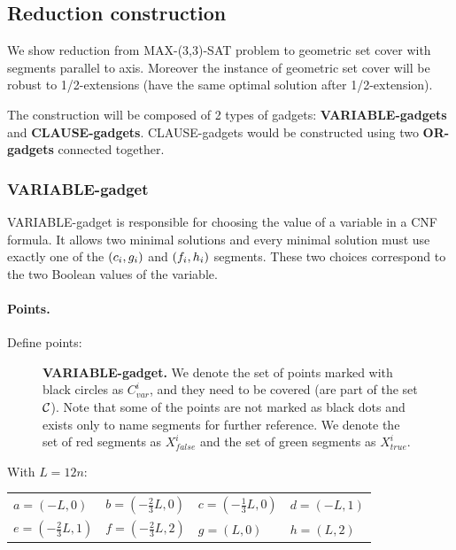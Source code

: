 \subsection{Reduction construction}
\label{construction_description}
We show reduction from MAX-(3,3)-SAT problem
to geometric set cover with segments
parallel to axis. Moreover the instance
of geometric set cover will be robust
to 1/2-extensions (have the same optimal solution
after 1/2-extension).

The construction will be composed of 2 types of gadgets:
\textbf{VARIABLE-gadgets} and \textbf{CLAUSE-gadgets}.
CLAUSE-gadgets would be constructed using two \textbf{OR-gadgets}
connected together.


\subsubsection{VARIABLE-gadget}

VARIABLE-gadget is responsible for choosing the value of a variable
in a CNF formula. It allows two minimal solutions
and every minimal solution must use exactly one of the
$(c_i, g_i)$ and $(f_i, h_i)$
segments. These two choices correspond to the two Boolean values of the variable.

\paragraph{Points.}

Define points:
\begin{figure}[h]
\centering
\def\svgwidth{0.5\columnwidth}

\caption{\textbf{VARIABLE-gadget.}
We denote the set of points marked with black circles as $C_{var}^i$,
and they need to be covered (are part of the set $\mathcal{C}$).
Note that some of the points are not marked as black dots
and exists only to name segments for further reference.
We denote the set of red segments as $X_{false}^i$
and the set of green segments as $X_{true}^i$.}
\label{fig:apx_choose_variable}
\end{figure}

With $L = 12n$:

\begin{center}
\begin{tabular}{ l l l l}
	$a = (-L, 0)$ &
	$b = (-\frac{2}{3}L, 0)$ & 
	$c = (-\frac{1}{3}L, 0)$ & 
	$d = (-L, 1)$ \\  
	$e = (-\frac{2}{3}L, 1)$ & 
	$f = (-\frac{2}{3}L, 2)$ &
	$g = (L, 0)$ &
	$h = (L, 2)$
\end{tabular}
\end{center}

